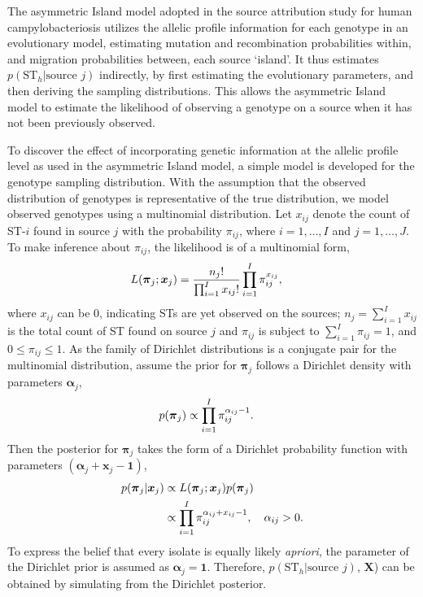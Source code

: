 \documentclass[times, doublespace]{simauth}%
\begin{document}
The asymmetric Island model \cite{Wilso} adopted in the source attribution study for human campylobacteriosis \cite{Marsh} utilizes the allelic profile information for each genotype in an evolutionary model, estimating mutation and recombination probabilities within, and migration probabilities between, each source `island'. It thus estimates $p(\text{ST}_h \vert \text{source }j)$ indirectly, by first estimating the evolutionary parameters, and then deriving the sampling distributions. This allows the asymmetric Island model to estimate the likelihood of observing a genotype on a source when it has not been previously observed.

To discover the effect of incorporating genetic information at the allelic profile level as used in the asymmetric Island model, a simple model is developed for the genotype sampling distribution. With the assumption that the observed distribution of genotypes is representative of the true distribution, we model observed genotypes using a multinomial distribution. Let $x_{ij}$ denote the count of ST-$i$ found in source $j$ with the probability $\pi_{ij}$, where $i=1, \ldots, I$ and $j=1, \ldots, J$. To make inference about $\pi_{ij}$, the likelihood is of a multinomial form,
\begin{align}
        L(\boldsymbol{\pi}_{j} ; \boldsymbol{x}_{j}) & = \frac{n_j!}{\prod_{i=1}^{I} x_{ij}!} \prod_{i=1}^I \pi_{ij}^{x_{ij}}, \notag
\end{align}
where $x_{ij}$ can be $0$, indicating STs are yet observed on the sources; $n_j=\sum_{i=1}^I x_{ij}$ is the total count of ST found on source $j$ and $\pi_{ij}$ is subject to $\sum_{i=1}^I \pi_{ij} =1$, and $0 \leq \pi_{ij} \leq 1$. As the family of Dirichlet distributions is a conjugate pair for the multinomial distribution, assume the prior for $\boldsymbol{\pi}_{j}$ follows a Dirichlet density with parameters $\boldsymbol{\alpha}_{j}$,
\begin{align}
  p(\boldsymbol{\pi}_{j}) & \propto \prod_{i=1}^{I}\pi_{ij}^{\alpha_{ij}-1}. \notag
\end{align}
Then the posterior for $\boldsymbol{\pi}_{j}$ takes the form of a Dirichlet probability function with parameters $(\boldsymbol{\alpha}_{j}+\boldsymbol{x}_{j}-\boldsymbol{1})$,
\begin{align}
        p(\boldsymbol{\pi}_{j} \vert \boldsymbol{x}_{j} ) & \propto L(\boldsymbol{\pi}_{j} ; \boldsymbol{x}_{j}) p(\boldsymbol{\pi}_{j}) \notag \\
       & \propto \prod_{i=1}^{I}\pi_{ij}^{\alpha_{ij} + x_{ij}-1}, \quad \alpha_{ij} >0. \notag
 \end{align}
To express the belief that every isolate is equally likely \emph{apriori}, the parameter of the Dirichlet prior is assumed as $\boldsymbol{\alpha}_{j}=\boldsymbol{1}$. Therefore, $p(\text{ST}_h \vert \text{source }j)$, $\boldsymbol{X}$) can be obtained by simulating from the Dirichlet posterior.
\end{document}
